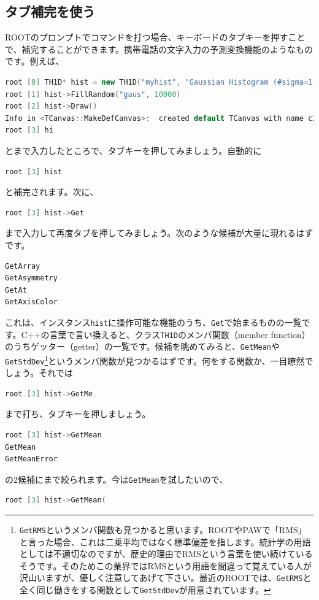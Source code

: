 \subsection{タブ補完を使う}
ROOTのプロンプトでコマンドを打つ場合、キーボードのタブキーを押すことで、補完することができます。携帯電話の文字入力の予測変換機能のようなものです。例えば、
\begin{lstlisting}[language=c++]
root [0] TH1D* hist = new TH1D("myhist", "Gaussian Histogram (#sigma=1)", 50, -5, 5)
root [1] hist->FillRandom("gaus", 10000)
root [2] hist->Draw()
Info in <TCanvas::MakeDefCanvas>:  created default TCanvas with name c1
root [3] hi
\end{lstlisting}
とまで入力したところで、タブキーを押してみましょう。自動的に
\begin{lstlisting}[language=c++]
root [3] hist
\end{lstlisting}
と補完されます。次に、
\begin{lstlisting}[language=c++]
root [3] hist->Get
\end{lstlisting}
まで入力して再度タブを押してみましょう。次のような候補が大量に現れるはずです。
\begin{lstlisting}[language=c++]
GetArray
GetAsymmetry
GetAt
GetAxisColor
\end{lstlisting}
これは、インスタンス\texttt{hist}に操作可能な機能のうち、\texttt{Get}で始まるものの一覧です。C++の言葉で言い換えると、クラス\texttt{TH1D}のメンバ関数（member function）のうちゲッター（getter）の一覧です。候補を眺めてみると、\texttt{GetMean}や\texttt{GetStdDev}\footnote{\texttt{GetRMS}というメンバ関数も見つかると思います。ROOTやPAWで「RMS」と言った場合、これは二乗平均ではなく標準偏差を指します。統計学の用語としては不適切なのですが、歴史的理由でRMSという言葉を使い続けているそうです。そのためこの業界ではRMSという用語を間違って覚えている人が沢山いますが、優しく注意してあげて下さい。最近のROOTでは、\texttt{GetRMS}と全く同じ働きをする関数として\texttt{GetStdDev}が用意されています。}というメンバ関数が見つかるはずです。何をする関数か、一目瞭然でしょう。それでは
\begin{lstlisting}[language=c++]
root [3] hist->GetMe
\end{lstlisting}
まで打ち、タブキーを押しましょう。
\begin{lstlisting}[language=c++]
root [3] hist->GetMean
GetMean
GetMeanError
\end{lstlisting}
の2候補にまで絞られます。今は\texttt{GetMean}を試したいので、
\begin{lstlisting}[language=c++]
root [3] hist->GetMean(
\end{lstlisting}
